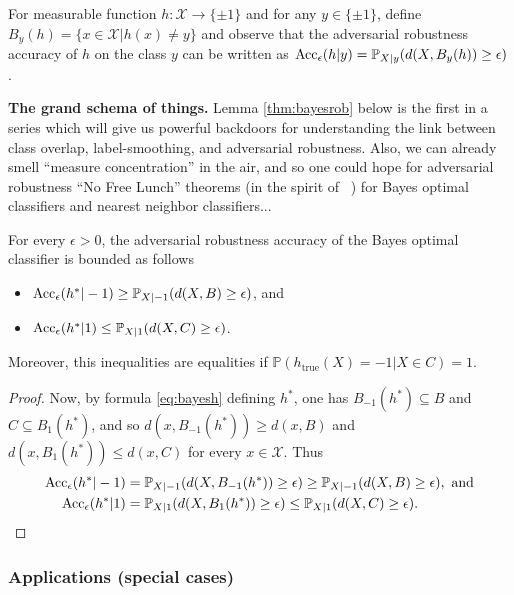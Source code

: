 For measurable function $h:\mathcal X \rightarrow \{\pm 1\}$ and for any $y \in
\{\pm 1\}$, define $B_y(h) = \{x \in \mathcal X | h(x) \ne y\}$ and observe
that the adversarial robustness accuracy of $h$ on the class $y$ can be written as
$\operatorname{Acc}_\epsilon(h|y)=\mathbb P_{X|y}(d(X,B_y(h)) \ge \epsilon)$.

\begin{mdframed}
  \textbf{The grand schema of things.}
  Lemma \ref{thm:bayesrob} below is the first in a series which will give us
  powerful backdoors for understanding the link between class overlap,
  label-smoothing, and adversarial robustness. Also, we can already smell
  ``measure concentration'' in the air, and so one could hope for adversarial
  robustness ``No Free Lunch'' theorems (in the spirit of
  ~\citep{dohmatob2018limitations}) for Bayes optimal classifiers and nearest
  neighbor classifiers...
\end{mdframed}


\begin{lemma}
For every $\epsilon > 0$, the adversarial robustness accuracy of the Bayes
optimal classifier is bounded as follows
\begin{itemize}
\item $\operatorname{Acc}_\epsilon(h^*|-1) \ge \mathbb P_{X|-1}(d(X,B)\ge \epsilon)$, and
\item $\operatorname{Acc}_\epsilon(h^*|1) \le \mathbb P_{X|1}(d(X,C)\ge \epsilon)$.
\end{itemize}
Moreover, this inequalities are equalities if $\mathbb P(h_{\text{true}}(X)=-1|X
\in C)=1$.
\label{thm:bayesrob}
\end{lemma}
\begin{proof}
  Now, by
  formula \eqref{eq:bayesh} defining $h^*$, one has $B_{-1}(h^*) \subseteq B$
  and $C \subseteq B_1(h^*)$, and so $d(x,B_{-1}(h^*)) \ge d(x,B)$ and
  $d(x,B_1(h^*)) \le d(x,C)$ for every $x \in \mathcal X$. Thus
  \begin{eqnarray*}
    \begin{split}
    \operatorname{Acc}_\epsilon(h^*|-1)&=\mathbb P_{X|-1}(d(X,B_{-1}(h^*)) \ge \epsilon) \ge
    \mathbb P_{X|-1}(d(X,B)\ge \epsilon),\text{ and}\\
    \operatorname{Acc}_\epsilon(h^*|1)&=\mathbb P_{X|1}(d(X,B_{1}(h^*)) \ge \epsilon) \le
    \mathbb P_{X|1}(d(X,C)\ge \epsilon).
    \end{split}
    \end{eqnarray*}
\end{proof}

\subsubsection{Applications (special cases)}
